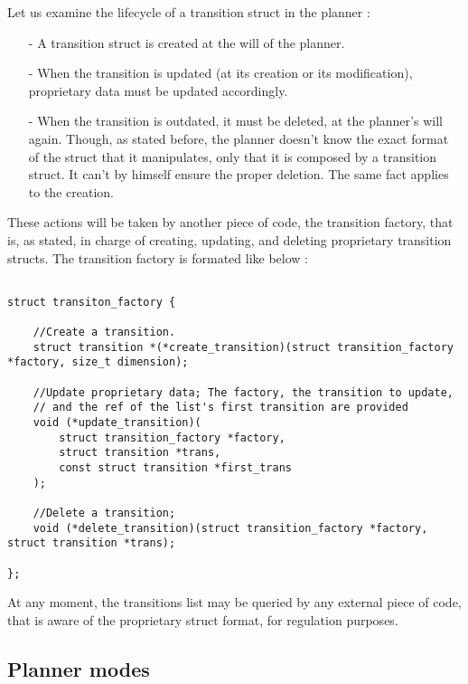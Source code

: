 Let us examine the lifecycle of a transition struct in the planner : 

\begin{itemize}

\item[-] A transition struct is created at the will of the planner.

\item[-] When the transition is updated (at its creation or its modification), proprietary data must be 
updated accordingly.

\item[-] When the transition is outdated, it must be deleted, at the planner's will again. 
Though, as stated before, the planner doesn't know the exact format of the struct that it manipulates, 
only that it is composed by a transition struct. It can't by himself ensure the proper deletion.
The same fact applies to the creation. 

\end{itemize}

These actions will be taken by another piece of code, the transition factory, that is, as stated, in charge
of creating, updating, and deleting proprietary transition structs.
The transition factory is formated like below : 

\begin{lstlisting}[style=CStyle]

struct transiton_factory {
	
	//Create a transition.
	struct transition *(*create_transition)(struct transition_factory *factory, size_t dimension);
	
	//Update proprietary data; The factory, the transition to update,
	// and the ref of the list's first transition are provided
	void (*update_transition)(
		struct transition_factory *factory,
		struct transition *trans,
		const struct transition *first_trans
	);
	
	//Delete a transition;
	void (*delete_transition)(struct transition_factory *factory, struct transition *trans);
	
};

\end{lstlisting}

At any moment, the transitions list may be queried by any external piece of code, that is aware of the
proprietary struct format, for regulation purposes. 

\subsection{Planner modes}

